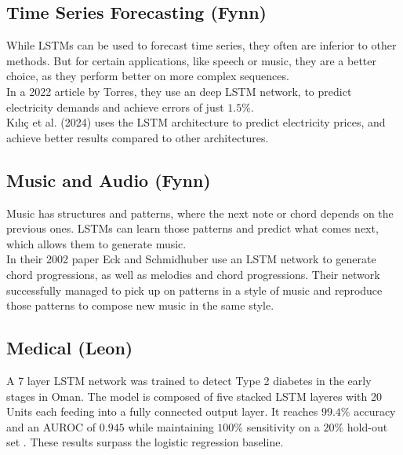 \documentclass[twoside,a4paper,10pt,DIV=12,BCOR=12mm]{scrartcl}
\begin{document}
\subsection{Time Series Forecasting (Fynn)}
While LSTMs can be used to forecast time series, they often are inferior to other methods.\cite{gers2001timeseries} But for certain applications, like speech or music, they are a better choice, as they perform better on more complex sequences.\cite{gers2001timeseries, cahuantzi2023lstmvsgru}\\
In a 2022 article by Torres, they use an deep LSTM network, to predict electricity demands and achieve errors of just \begin{math}1.5\%\end{math}.\cite{torres2022elctricityforecasting}\\
Kılıç et al. (2024) uses the LSTM architecture to predict electricity prices, and achieve better results compared to other architectures.\cite{nielsen2024electricitypriceforcasting}

\subsection{Music and Audio (Fynn)}
Music has structures and patterns, where the next note or chord depends on the previous ones. LSTMs can learn those patterns and predict what comes next, which allows them to generate music.\cite{eck2002musicgeneration}\\
In their 2002 paper Eck and Schmidhuber use an LSTM network to generate chord progressions, as well as melodies and chord progressions. Their network successfully managed to pick up on patterns in a style of music and reproduce those patterns to compose new music in the same style.\cite{eck2002musicgeneration}  

\subsection{Medical (Leon)}

A 7 layer LSTM network was trained to detect Type 2 diabetes in the early stages in Oman. The model is composed of five stacked
LSTM layeres with 20 Units each feeding into a fully connected output layer. It reaches \begin{math}99.4 \%\end{math} accuracy and an 
AUROC of \begin{math}0.945\end{math} while maintaining \begin{math}100 \%\end{math} sensitivity on a \begin{math}20 \%\end{math} hold-out set \cite{AlSadi2024LSTM}.
These results surpass the logistic regression baseline.
\end{document}
